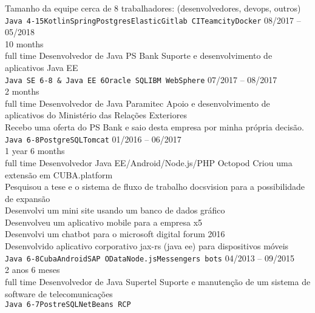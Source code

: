 \begin{entrylist}
{    Tamanho da equipe cerca de 8 trabalhadores: (desenvolvedores, devops, outros) \\
    \texttt{Java 4-15}\slashsep\texttt{Kotlin}\slashsep\texttt{Spring}\slashsep\texttt{Postgres}\slashsep\texttt{Elastic}\slashsep\texttt{Gitlab CI}\slashsep\texttt{Teamcity}\slashsep\texttt{Docker}}
    \entry
    {08/2017 -- 05/2018\\\footnotesize{10 months\\full time}}
    {Desenvolvedor de Java}
    {PS Bank}
    {
        Suporte e desenvolvimento de aplicativos Java EE \\
        \texttt{Java SE 6-8 \& Java EE 6}\slashsep\texttt{Oracle SQL}\slashsep\texttt{IBM WebSphere}}
    \entry
    {07/2017 -- 08/2017\\\footnotesize{2 months\\full time}}
    {Desenvolvedor de Java}
    {Paramitec}
    {
        Apoio e desenvolvimento de aplicativos do Ministério das Relações Exteriores \\
        Recebo uma oferta do PS Bank e saio desta empresa por minha própria decisão. \\
        \texttt{Java 6-8}\slashsep\texttt{PostgreSQL}\slashsep\texttt{Tomcat}}
    \entry
    {01/2016 -- 06/2017\\\footnotesize{1 year 6 months\\full time}}
    {Desenvolvedor Java EE/Android/Node.js/PHP}
    {Octopod}
    {
        Criou uma extensão em CUBA.platform \\
        Pesquisou a tese e o sistema de fluxo de trabalho docsvision para a possibilidade de expansão \\
        Desenvolvi um mini site usando um banco de dados gráfico \\
        Desenvolveu um aplicativo mobile para a empresa x5 \\
        Desenvolvi um chatbot para o microsoft digital forum 2016 \\
        Desenvolvido aplicativo corporativo jax-rs (java ee) para dispositivos móveis\\
    \texttt{Java 6-8}\slashsep\texttt{Cuba}\slashsep\texttt{Android}\slashsep\texttt{SAP OData}\slashsep\texttt{Node.js}\slashsep\texttt{Messengers bots}}
    \entry
    {04/2013 -- 09/2015\\\footnotesize{2 anos 6 meses\\full time}}
    {Desenvolvedor de Java}
    {Supertel}
    {
        Suporte e manutenção de um sistema de software de telecomunicações \\
        \texttt{Java 6-7}\slashsep\texttt{PostreSQL}\slashsep\texttt{NetBeans RCP}}


\end{entrylist}
